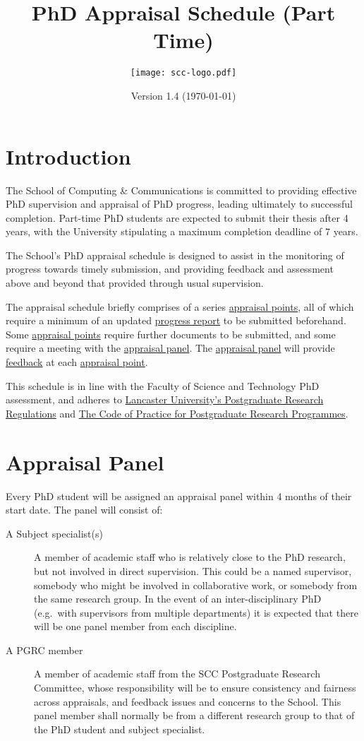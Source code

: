\documentclass[12pt,a4paper]{article}
\title{PhD Appraisal Schedule (Part Time)}
\author{\texttt{[image: scc-logo.pdf]}}
\date{Version 1.4 (\today)}
\begin{document}
\maketitle

\section{Introduction}
The School of Computing \& Communications is committed to providing effective PhD supervision and appraisal of PhD progress, leading ultimately to successful completion. Part-time PhD students are expected to submit their thesis after 4 years, with the University stipulating a maximum completion deadline of 7 years.

The School's PhD appraisal schedule is designed to assist in the monitoring of progress towards timely submission, and providing feedback and assessment above and beyond that provided through usual supervision.

The appraisal schedule briefly comprises of a series \hyperref[sec:points]{appraisal points}, all of which require a minimum of an updated \hyperref[sec:report]{progress report} to be submitted beforehand. Some \hyperref[sec:points]{appraisal points} require further documents to be submitted, and some require a meeting with the \hyperref[sec:panel]{appraisal panel}. The \hyperref[sec:panel]{appraisal panel} will provide \hyperref[sec:feedback]{feedback} at each \hyperref[sec:points]{appraisal point}.

This schedule is in line with the Faculty of Science and Technology PhD assessment, and adheres to
\href{https://gap.lancs.ac.uk/ASQ/QAE/MARP/Documents/PGR-Regs.pdf}{Lancaster University's Postgraduate Research Regulations} and 
\href{https://gap.lancs.ac.uk/ASQ/Policies/Documents/Postgraduate-Research-Code-of-Practice.pdf}{The Code of Practice for Postgraduate Research Programmes}.

\section{Appraisal Panel} \label{sec:panel}
Every PhD student will be assigned an appraisal panel within 4 months of their start date. The panel will consist of:
\begin{description}
	\item[A Subject specialist(s)] A member of academic staff who is relatively close to the PhD research, but not involved in direct supervision. This could be a named supervisor, somebody who might be involved in collaborative work, or somebody from the same research group. In the event of an inter-disciplinary PhD (e.g.\ with supervisors from multiple departments) it is expected that there will be one panel member from each discipline.
	\item[A PGRC member] A member of academic staff from the SCC Postgraduate Research Committee, whose responsibility will be to ensure consistency and fairness across appraisals, and feedback issues and concerns to the School. This panel member shall normally be from a different research group to that of the PhD student and subject specialist.
\end{description}
\end{document}
